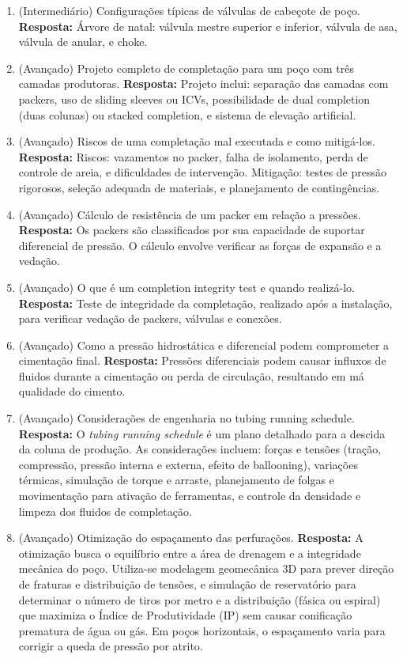 \documentclass[11pt,a4paper]{article}
\begin{document}
\begin{enumerate}
  \item (Intermediário) Configurações típicas de válvulas de cabeçote de poço.
  \textbf{Resposta:} Árvore de natal: válvula mestre superior e inferior, válvula de asa, válvula de anular, e choke.

  \item (Avançado) Projeto completo de completação para um poço com três camadas produtoras.
  \textbf{Resposta:} Projeto inclui: separação das camadas com packers, uso de sliding sleeves ou ICVs, possibilidade de dual completion (duas colunas) ou stacked completion, e sistema de elevação artificial.

  \item (Avançado) Riscos de uma completação mal executada e como mitigá-los.
  \textbf{Resposta:} Riscos: vazamentos no packer, falha de isolamento, perda de controle de areia, e dificuldades de intervenção. Mitigação: testes de pressão rigorosos, seleção adequada de materiais, e planejamento de contingências.

  \item (Avançado) Cálculo de resistência de um packer em relação a pressões.
  \textbf{Resposta:} Os packers são classificados por sua capacidade de suportar diferencial de pressão. O cálculo envolve verificar as forças de expansão e a vedação.

  \item (Avançado) O que é um completion integrity test e quando realizá-lo.
  \textbf{Resposta:} Teste de integridade da completação, realizado após a instalação, para verificar vedação de packers, válvulas e conexões.

  \item (Avançado) Como a pressão hidrostática e diferencial podem comprometer a cimentação final.
  \textbf{Resposta:} Pressões diferenciais podem causar influxos de fluidos durante a cimentação ou perda de circulação, resultando em má qualidade do cimento.

  \item (Avançado) Considerações de engenharia no tubing running schedule.
  \textbf{Resposta:} O \textit{tubing running schedule} é um plano detalhado para a descida da coluna de produção. As considerações incluem: forças e tensões (tração, compressão, pressão interna e externa, efeito de ballooning), variações térmicas, simulação de torque e arraste, planejamento de folgas e movimentação para ativação de ferramentas, e controle da densidade e limpeza dos fluidos de completação.

  \item (Avançado) Otimização do espaçamento das perfurações.
  \textbf{Resposta:} A otimização busca o equilíbrio entre a área de drenagem e a integridade mecânica do poço. Utiliza-se modelagem geomecânica 3D para prever direção de fraturas e distribuição de tensões, e simulação de reservatório para determinar o número de tiros por metro e a distribuição (fásica ou espiral) que maximiza o Índice de Produtividade (IP) sem causar conificação prematura de água ou gás. Em poços horizontais, o espaçamento varia para corrigir a queda de pressão por atrito.


\end{enumerate}
\end{document}
